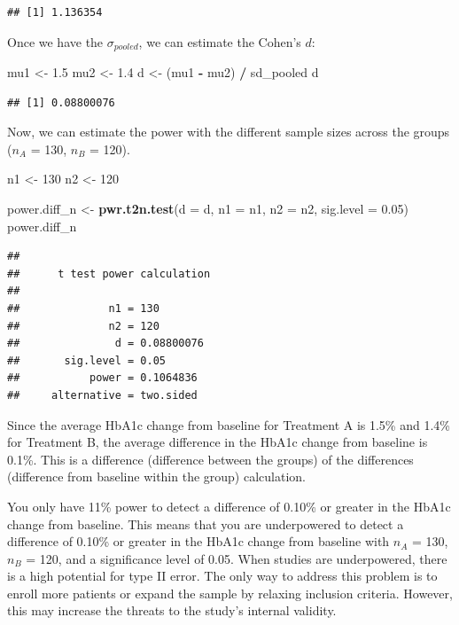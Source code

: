 \documentclass[
]{book}
\newenvironment{Shaded}{\begin{snugshade}}{\end{snugshade}}
\newcommand{\AttributeTok}[1]{\textcolor[rgb]{0.13,0.29,0.53}{#1}}
\newcommand{\DecValTok}[1]{\textcolor[rgb]{0.00,0.00,0.81}{#1}}
\newcommand{\FloatTok}[1]{\textcolor[rgb]{0.00,0.00,0.81}{#1}}
\newcommand{\FunctionTok}[1]{\textcolor[rgb]{0.13,0.29,0.53}{\textbf{#1}}}
\newcommand{\NormalTok}[1]{#1}
\newcommand{\OtherTok}[1]{\textcolor[rgb]{0.56,0.35,0.01}{#1}}
\newcommand{\SpecialCharTok}[1]{\textcolor[rgb]{0.81,0.36,0.00}{\textbf{#1}}}
\begin{document}
\begin{verbatim}
## [1] 1.136354
\end{verbatim}

Once we have the \(\sigma_{pooled}\), we can estimate the Cohen's \(d\):

\begin{Shaded}
\begin{Highlighting}[]
\NormalTok{mu1 }\OtherTok{\textless{}{-}} \FloatTok{1.5}
\NormalTok{mu2 }\OtherTok{\textless{}{-}} \FloatTok{1.4}
\NormalTok{d }\OtherTok{\textless{}{-}}\NormalTok{ (mu1 }\SpecialCharTok{{-}}\NormalTok{ mu2) }\SpecialCharTok{/}\NormalTok{ sd\_pooled}
\NormalTok{d}
\end{Highlighting}
\end{Shaded}

\begin{verbatim}
## [1] 0.08800076
\end{verbatim}

Now, we can estimate the power with the different sample sizes across the groups (\(n_{A}\) = 130, \(n_{B}\) = 120).

\begin{Shaded}
\begin{Highlighting}[]
\NormalTok{n1 }\OtherTok{\textless{}{-}} \DecValTok{130}
\NormalTok{n2 }\OtherTok{\textless{}{-}} \DecValTok{120}

\NormalTok{power.diff\_n }\OtherTok{\textless{}{-}} \FunctionTok{pwr.t2n.test}\NormalTok{(}\AttributeTok{d =}\NormalTok{ d, }\AttributeTok{n1 =}\NormalTok{ n1, }\AttributeTok{n2 =}\NormalTok{ n2, }\AttributeTok{sig.level =} \FloatTok{0.05}\NormalTok{)}
\NormalTok{power.diff\_n}
\end{Highlighting}
\end{Shaded}

\begin{verbatim}
## 
##      t test power calculation 
## 
##              n1 = 130
##              n2 = 120
##               d = 0.08800076
##       sig.level = 0.05
##           power = 0.1064836
##     alternative = two.sided
\end{verbatim}

Since the average HbA1c change from baseline for Treatment A is 1.5\% and 1.4\% for Treatment B, the average difference in the HbA1c change from baseline is 0.1\%. This is a difference (difference between the groups) of the differences (difference from baseline within the group) calculation.

You only have 11\% power to detect a difference of 0.10\% or greater in the HbA1c change from baseline. This means that you are underpowered to detect a difference of 0.10\% or greater in the HbA1c change from baseline with \(n_{A}\) = 130, \(n_{B}\) = 120, and a significance level of 0.05. When studies are underpowered, there is a high potential for type II error. The only way to address this problem is to enroll more patients or expand the sample by relaxing inclusion criteria. However, this may increase the threats to the study's internal validity.
\end{document}
